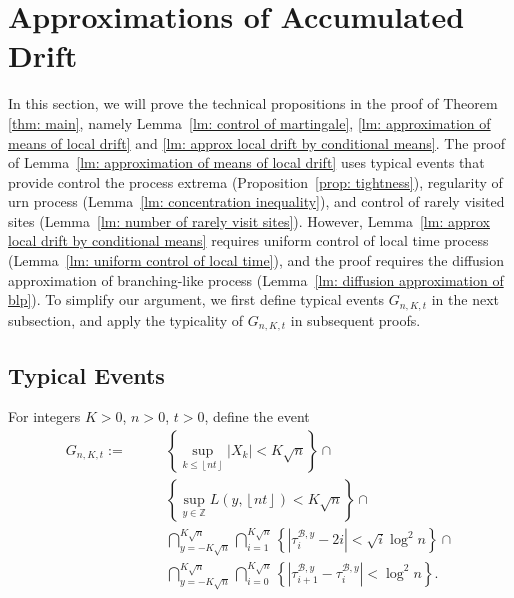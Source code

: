\documentclass[twoside,12pt, a4paper]{article}
\numberwithin{equation}{section}
\theoremstyle{remark}
\begin{document}
	
	
	\section{Approximations of Accumulated Drift}\label{sec: approximations}
	
	In this section, we will prove the technical propositions in the proof of Theorem \ref{thm: main}, namely Lemma~\ref{lm: control of martingale}, \ref{lm: approximation of means of local drift} and \ref{lm: approx local drift by conditional means}. 
	The proof of Lemma~\ref{lm: approximation of means of local drift} uses typical events that provide control the process extrema (Proposition~\ref{prop: tightness}), regularity of urn process (Lemma~\ref{lm: concentration inequality}), and control of rarely visited sites (Lemma~\ref{lm: number of rarely visit sites}). 
	However, Lemma~\ref{lm: approx local drift by conditional means} requires uniform control of local time process (Lemma~\ref{lm: uniform control of local time}), and the proof requires the diffusion approximation of branching-like process (Lemma~\ref{lm: diffusion approximation of blp}).
	To simplify our argument, we first define typical events $G_{n, K, t}$ in the next subsection, and apply the typicality of $G_{n, K, t}$ in subsequent proofs.
	
	\subsection{Typical Events}
	
	For integers $K>0$, $n > 0$, $t>0$, define the event
	\begin{align}
		G_{n,K,t} :=  \qquad
		\label{eqn:good-event-1}
		& \left\{\sup _{k \le \left\lfloor nt  \right\rfloor} |X_k| < K \sqrt{n} \right\} \cap \\
		\label{eqn:good-event-2}
		& \left\{\sup_{y \in \mathbb{Z}} L(y, \left\lfloor nt  \right\rfloor) < K \sqrt{n} \right\} \cap \\
		\label{eqn:good-event-3}
		& \bigcap_{y = - K \sqrt{n} }^{K \sqrt{n}} 
		\bigcap_{i = 1}^{K \sqrt{n} } \left\{\left| \tau_i^{\mathcal{B},y} - 2 i \right| < \sqrt{ i } \log^2 n \right\}  \cap \\
		\label{eqn:good-event-4}
		& \bigcap_{y = - K \sqrt{n} }^{K \sqrt{n}} 
		\bigcap_{i = 0}^{K \sqrt{n} } \left\{\left| \tau_{i+1}^{\mathcal{B},y} - \tau_i^{\mathcal{B},y} \right| < \log^2 n \right\}  
		.\end{align}
	
\end{document}
